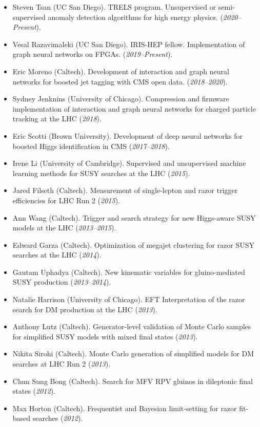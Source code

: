 \documentclass[11pt]{res}
\begin{document}
\begin{resume}
\begin{itemize}
\item Steven Tsan (UC San Diego). TRELS program. Unsupervised or semi-supervised anomaly detection algorithms for high energy physics. (\textit{2020--Present}).
\item Vesal Razavimaleki (UC San Diego). IRIS-HEP fellow. Implementation of graph neural networks on FPGAs. (\textit{2019--Present}).
\item Eric Moreno (Caltech). Development of interaction and graph neural networks for boosted jet tagging with CMS open data. (\textit{2018--2020}).
\item Sydney Jenknins (University of Chicago). Compression and firmware implementation of interaction and graph neural networks for charged particle tracking at the LHC (\textit{2018}).
\item Eric Scotti (Brown University). Development of deep neural networks for boosted Higgs identification in CMS (\textit{2017--2018}).
\item Irene Li (University of Cambridge). Supervised and unsupervised machine learning methods for SUSY searches at the LHC (\textit{2015}).
\item Jared Filseth (Caltech). Measurement of single-lepton and razor trigger efficiencies for LHC Run 2 (\textit{2015}).
\item Ann Wang (Caltech). Trigger and search strategy for new Higgs-aware SUSY models at the LHC (\textit{2013--2015}).
\item Edward Garza (Caltech). Optimization of megajet clustering for razor SUSY searches at the LHC (\textit{2014}).
\item Gautam Uphadya (Caltech). New kinematic variables for gluino-mediated SUSY production (\textit{2013--2014}).
\item Natalie Harrison (University of Chicago). EFT Interpretation of the razor search for DM production at the LHC (\textit{2013}).
\item Anthony Lutz (Caltech). Generator-level validation of Monte Carlo samples for simplified SUSY models with mixed final states (\textit{2013}).
\item Nikita Sirohi (Caltech). Monte Carlo generation of simplified models for DM searches at LHC Run 2 (\textit{2013}).
\item Chun Sung Bong (Caltech). Search for MFV RPV gluinos in dileptonic final states (\textit{2012}).
\item Max Horton (Caltech). Frequentist and Bayesian limit-setting for razor fit-based searches (\textit{2012}).
\end{itemize}


\end{resume}
\end{document}
